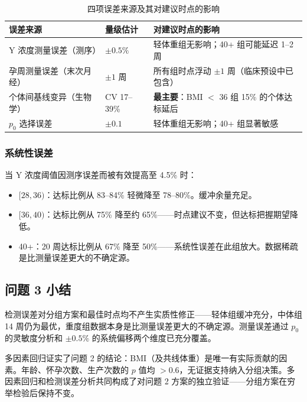 \documentclass{mcm-paper}
\begin{document}
\begin{table}[H]
\centering
\caption{四项误差来源及其对建议时点的影响}
\begin{tabular}{lll}
\toprule
误差来源 & 量级估计 & 对建议时点的影响 \\
\midrule
Y 浓度测量误差（测序） & $\pm 0.5\%$ & 轻体重组无影响；40+ 组可能延迟 1--2 周 \\
孕周测量误差（末次月经） & $\pm 1$ 周 & 所有组时点浮动 $\pm 1$ 周（临床预设中已包含） \\
个体间基线变异（生物学） & CV 17--39\% & \textbf{最主要}：BMI $<$ 36 组 15\% 的个体达标延后 \\
$p_0$ 选择误差 & $\pm 0.1$ & 轻体重组无影响；40+ 组显著敏感 \\
\bottomrule
\end{tabular}
\end{table}

\subsubsection{系统性误差}

当 Y 浓度阈值因测序误差而被有效提高至 4.5\% 时：

\begin{itemize}
    \item $[28,36)$：达标比例从 83--84\% 轻微降至 78--80\%。缓冲余量充足。
    \item $[36,40)$：达标比例从 75\% 降至约 65\%——时点建议不变，但达标把握期望降低。
    \item 40+：20 周达标比例从 67\% 降至 50\%——系统性误差在此组放大。数据稀疏是比测量误差更大的不确定源。
\end{itemize}

\subsection{问题 3 小结}

检测误差对分组方案和最佳时点均不产生实质性修正——轻体组缓冲充分，中体组 14 周仍为最优，重度组数据本身是比测量误差更大的不确定源。测量误差通过 $p_0$ 的灵敏度分析和 $\pm 0.5\%$ 的系统偏移两个维度已充分覆盖。

多因素回归证实了问题 2 的结论：BMI（及共线体重）是唯一有实际贡献的因素。年龄、怀孕次数、生产次数的 $p$ 值均 $>0.6$，无证据支持纳入分组决策。多因素回归和检测误差分析共同构成了对问题 2 方案的独立验证——分组方案在穷举检验后保持不变。

\newpage

\end{document}
